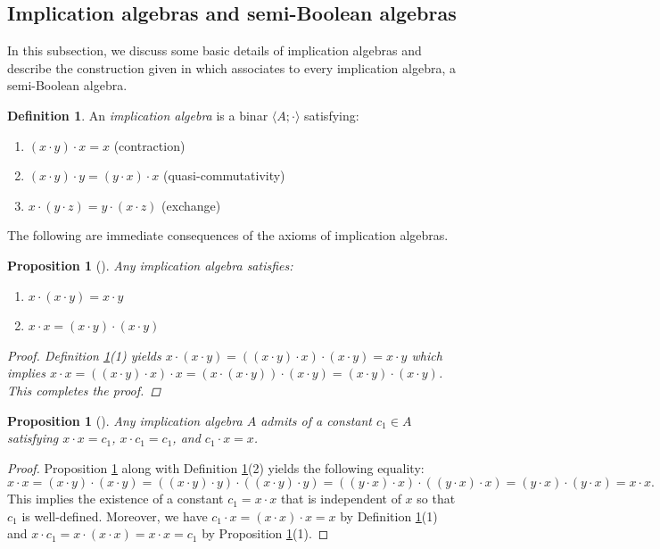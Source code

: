 \documentclass[reqno]{amsart}
\theoremstyle{plain}
\newtheorem{proposition}[theorem]{Proposition}
\theoremstyle{definition}
\newtheorem{definition}[theorem]{Definition}
\begin{document}
\subsection{Implication algebras and semi-Boolean algebras} In this subsection, we discuss some basic details of implication algebras and describe the construction given in \cite{abbott672} which associates to every implication algebra, a semi-Boolean algebra. 
\begin{definition}\label{bia}
    An \emph{implication algebra} is a binar $\langle A;\cdot\rangle$ satisfying:
    \begin{enumerate}
        \item $(x\cdot y)\cdot x=x$ \hfill (contraction)
        \item $(x\cdot y)\cdot y=(y\cdot x)\cdot x$ \hfill (quasi-commutativity)
        \item $x\cdot (y\cdot z)=y\cdot(x\cdot z)$ \hfill (exchange)
    \end{enumerate}
\end{definition}
The following are immediate consequences of the axioms of implication algebras. 
\begin{proposition}[\cite{abbott672}]\label{prop1}
    Any implication algebra satisfies: 
    \begin{enumerate}
        \item $x\cdot (x\cdot y)=x\cdot y$
        \item $x\cdot x=(x\cdot y)\cdot(x\cdot y)$
    \end{enumerate}
    \begin{proof}
        Definition \ref{bia}(1) yields $x\cdot(x\cdot y)=((x\cdot y)\cdot x)\cdot(x\cdot y)=x\cdot y$ which implies $x\cdot x=((x\cdot y)\cdot x)\cdot x=(x\cdot(x\cdot y))\cdot(x\cdot y)=(x\cdot y)\cdot(x\cdot y)$. This completes the proof.     
    \end{proof}
\end{proposition}

\begin{proposition}[\cite{abbott672}]\label{constant1}
    Any implication algebra $A$ admits of a constant $c_1\in A$ satisfying $x\cdot x=c_1$, $x\cdot c_1=c_1$, and $c_1\cdot x=x$. 
\end{proposition}
\begin{proof}
Proposition \ref{prop1} along with Definition \ref{bia}(2) yields the following equality: \[x\cdot x=(x\cdot y)\cdot(x\cdot y)=((x\cdot y)\cdot y)\cdot((x\cdot y)\cdot y)=((y\cdot x)\cdot x)\cdot((y\cdot x)\cdot x)=(y\cdot x)\cdot(y\cdot x)=x\cdot x.\] This implies the existence of a constant $c_1=x\cdot x$ that is independent of $x$ so that $c_1$ is well-defined. Moreover, we have $c_1\cdot x=(x\cdot x)\cdot x=x$ by Definition \ref{bia}(1) and $x\cdot c_1=x\cdot(x\cdot x)=x\cdot x=c_1$ by Proposition \ref{prop1}(1).  
\end{proof}
 
\end{document}
